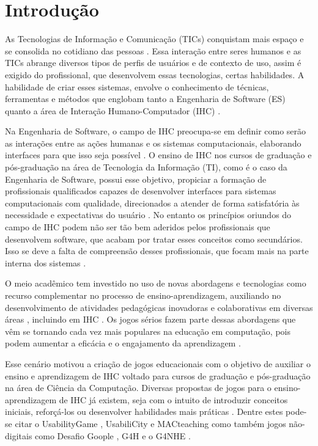 \chapter{Introdução}
\label{chap:intro}

As Tecnologias de Informação e Comunicação (TICs) conquistam mais espaço e se consolida no cotidiano das pessoas \cite{Sales2020}. Essa interação entre seres humanos e as TICs abrange diversos tipos de perfis de usuários e de contexto de uso, assim é exigido do profissional, que desenvolvem essas tecnologias, certas habilidades. A habilidade de criar esses sistemas, envolve o conhecimento de técnicas, ferramentas e métodos que englobam tanto a Engenharia de Software (ES) quanto a área de Interação Humano-Computador (IHC) \cite[p. 2]{barbosa_silva}.  

Na Engenharia de Software, o campo de IHC preocupa-se em definir como serão as interações entre as ações humanas e os sistemas computacionais, elaborando interfaces para que isso seja possível \cite{queiroz, sommariva} \cite[p. 89,90]{acm_curricula}. O ensino de IHC nos cursos de graduação e pós-graduação na área de Tecnologia da Informação (TI), como é o caso da Engenharia de Software, possui esse objetivo, propiciar a formação de profissionais qualificados capazes de desenvolver interfaces para sistemas computacionais com qualidade, direcionados a atender de forma satisfatória às necessidade e expectativas do usuário \cite[p. 89,  90]{acm_curricula} \cite[p. 7-14]{barbosa_silva}. No entanto os princípios oriundos do campo de IHC podem não ser tão bem aderidos pelos profissionais que desenvolvem software, que acabam por tratar esses conceitos como secundários. Isso se deve a falta de compreensão desses profissionais, que focam mais na parte interna dos sistemas \cite{sommariva}.

O meio acadêmico tem investido no uso de novas abordagens e tecnologias como recurso complementar no processo de ensino-aprendizagem, auxiliando no desenvolvimento de atividades pedagógicas inovadoras e colaborativas em diversas áreas \cite{battistella, brito}, incluindo em IHC \cite{Sales2020,Sales2020UsoTDS}. Os jogos sérios fazem parte dessas abordagens que vêm se tornando cada vez mais populares na educação em computação, pois podem aumentar a eficácia e o engajamento da aprendizagem \cite{battistella, brito, queiroz}.

Esse cenário motivou a criação de jogos educacionais com o objetivo de auxiliar o ensino e aprendizagem de IHC voltado para cursos de graduação e pós-graduação na área de Ciência da Computação. Diversas propostas de jogos para o ensino-aprendizagem de IHC já existem, seja com o intuito de introduzir conceitos iniciais, reforçá-los ou desenvolver habilidades mais práticas \cite{darin}. Dentre estes pode-se citar o UsabilityGame \cite{sommariva}, UsabiliCity \cite{ferreira2014a,ferreira2014b} e MACteaching \cite{brito,queiroz} como também jogos não-digitais como Desafio Goople \cite{darin}, G4H \cite{juca2017} e o G4NHE \cite{deSousa2019} .


